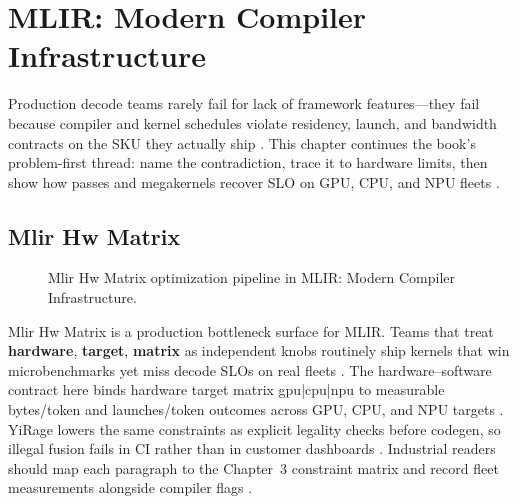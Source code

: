 \chapter{MLIR: Modern Compiler Infrastructure}
\label{chap:ch14}

Production decode teams rarely fail for lack of framework features---they fail because compiler and kernel schedules violate residency, launch, and bandwidth contracts on the SKU they actually ship \citep{patel2025llminference,nvidia2022hopper}. This chapter continues the book's problem-first thread: name the contradiction, trace it to hardware limits, then show how passes and megakernels recover SLO on GPU, CPU, and NPU fleets \citep{taxbreak2026,semianalysis2024tma}.

\section{Mlir Hw Matrix}
\label{sec:mlir_hw_matrix}
\begin{figure}[t]
\centering
{}
\caption{Mlir Hw Matrix optimization pipeline in MLIR: Modern Compiler Infrastructure.}
\label{fig:mlir_hw_matrix_pipeline}
\end{figure}


Mlir Hw Matrix is a production bottleneck surface for MLIR. Teams that treat \textbf{hardware}, \textbf{target}, \textbf{matrix} as independent knobs routinely ship kernels that win microbenchmarks yet miss decode SLOs on real fleets \citep{patel2025llminference,nvidia2022hopper}. The hardware--software contract here binds hardware target matrix gpu|cpu|npu to measurable bytes/token and launches/token outcomes across GPU, CPU, and NPU targets \citep{taxbreak2026,semianalysis2024tma}. YiRage lowers the same constraints as explicit legality checks before codegen, so illegal fusion fails in CI rather than in customer dashboards \citep{memoryfloor2026,amd2024xdna}. Industrial readers should map each paragraph to the Chapter~3 constraint matrix and record fleet measurements alongside compiler flags \citep{nvidia2022hopper,amd2024aie}.

